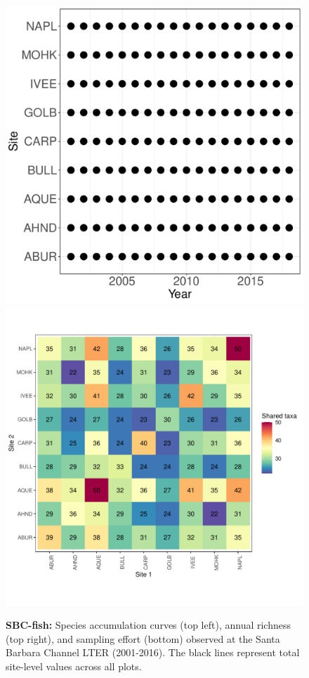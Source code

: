 \documentclass[11pt, oneside]{article}
\begin{document}
\begin{figure}[h!]
\includegraphics[scale = 0.4]{sbc-fish-castorani_spatiotemporal_sampling_effort.pdf}
\includegraphics[scale = 0.4]{sbc-fish-castorani_spp_shared.pdf}
\caption{{\bf SBC-fish:} Species accumulation curves (top left),  annual richness (top right), and sampling effort (bottom)  observed at the Santa Barbara Channel LTER (2001-2016). The black lines represent total site-level values across all plots.}
\label{sbc-fish}
\end{figure}
\end{document}

